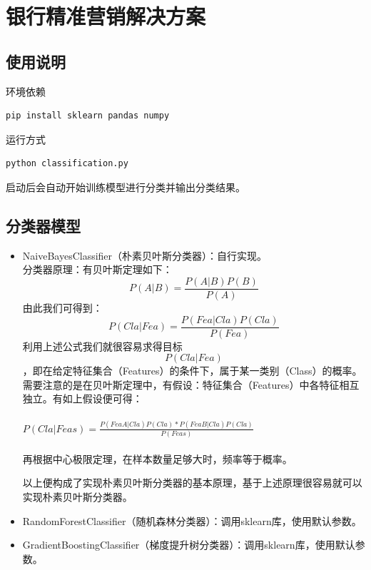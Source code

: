 \documentclass{acm_proc_article-sp}
\begin{document}

\section{银行精准营销解决方案}
\subsection{使用说明}
环境依赖
\begin{lstlisting}
pip install sklearn pandas numpy
\end{lstlisting}

运行方式
\begin{lstlisting}
python classification.py
\end{lstlisting}
启动后会自动开始训练模型进行分类并输出分类结果。

\subsection{分类器模型}
\begin{itemize}
    \item NaiveBayesClassifier（朴素贝叶斯分类器）：自行实现。\\
    分类器原理：有贝叶斯定理如下：
    $$P(A|B) = \frac{P(A|B)P(B)}{P(A)}$$
    由此我们可得到：
    $$P(Cla|Fea)=\frac{P(Fea|Cla)P(Cla)}{P(Fea)}$$
    利用上述公式我们就很容易求得目标$$P(Cla|Fea)$$，即在给定特征集合（Features）的条件下，属于某一类别（Class）的概率。需要注意的是在贝叶斯定理中，有假设：特征集合（Features）中各特征相互独立。有如上假设便可得：\\ \\
    $P(Cla|Feas)=\frac{P(FeaA|Cla)P(Cla)*P(FeaB|Cla)P(Cla)}{P(Feas)}$ \\ \\
    再根据中心极限定理，在样本数量足够大时，频率等于概率。

    以上便构成了实现朴素贝叶斯分类器的基本原理，基于上述原理很容易就可以实现朴素贝叶斯分类器。

    \item RandomForestClassifier（随机森林分类器）：调用sklearn库，使用默认参数。
    \item GradientBoostingClassifier（梯度提升树分类器）：调用sklearn库，使用默认参数。
\end{itemize}
\end{document}
